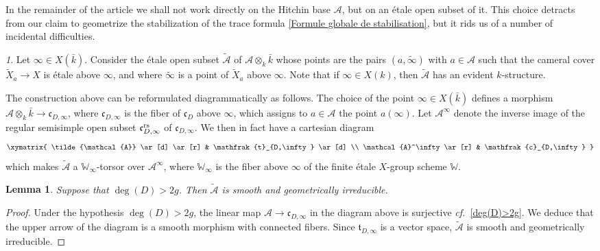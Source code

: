 \documentclass[12pt,english]{smfart}
\numberwithin{equation}{subsection}
\newtheorem{lemma}[equation]{Lemma}
\theoremstyle{remark}
\newtheorem{numero}[equation]{}
\newcommand\cf{{\it cf.\ }}
\newcommand\rs{{\rm rs}}
\begin{document}
In the remainder of the article we shall not work directly on the Hitchin base $\mathcal{A}$, but on an \'etale open subset of it. This choice detracts from our claim to geometrize the stabilization of the trace formula \ref{Formule globale de stabilisation}, but it rids us of a number of incidental difficulties.

\begin{numero}\label{tilde A def}
Let $\infty\in X(\bar k)$. Consider the \'etale open subset $\tilde{\mathcal{A}}$ of $\mathcal{A}\otimes_k\bar k$ whose points are the pairs $(a,\tilde\infty)$ with $a\in\mathcal{A}$ such that the cameral cover $\widetilde X_a\rightarrow X$ is \'etale above $\infty$, and where $\tilde\infty$ is a point of $\widetilde X_a$ above $\infty$. Note that if $\infty\in X(k)$, then $\tilde{\mathcal{A}}$ has an evident $k$-structure.

The construction above can be reformulated diagrammatically as follows. The choice of the point $\infty\in X(\bar k)$ defines a morphism $\mathcal{A}\otimes_k\bar k\rightarrow \mathfrak{c}_{D,\infty}$, where $\mathfrak{c}_{D,\infty}$ is the fiber of $\mathfrak{c}_D$ above $\infty$, which assigns to $a\in\mathcal{A}$ the point $a(\infty)$. Let $\mathcal{A}^\infty$ denote the inverse image of the regular semisimple open subset $\mathfrak{c}^\rs_{D,\infty}$ of $\mathfrak{c}_{D,\infty}$. We then in fact have a cartesian diagram
$$
\xymatrix{
\tilde{\mathcal{A}} \ar[d] \ar[r] & \mathfrak{t}_{D,\infty} \ar[d] \\
\mathcal{A}^\infty \ar[r] & \mathfrak{c}_{D,\infty}
}
$$
which makes $\tilde{\mathcal{A}}$ a $\mathbb{W}_\infty$-torsor over $\mathcal{A}^\infty$, where $\mathbb{W}_\infty$ is the fiber above $\infty$ of the finite \'etale $X$-group scheme $\mathbb{W}$.
\end{numero}

\begin{lemma}\label{connexe tilde A}
Suppose that $\deg(D)>2g$. Then $\tilde{\mathcal{A}}$ is smooth and geometrically irreducible.
\end{lemma}

\begin{proof}
Under the hypothesis $\deg(D)>2g$, the linear map $\mathcal{A}\rightarrow\mathfrak{c}_{D,\infty}$ in the diagram above is surjective \cf \ref{deg(D)>2g}. We deduce that the upper arrow of the diagram is a smooth morphism with connected fibers. Since $\mathfrak{t}_{D,\infty}$ is a vector space, $\tilde{\mathcal{A}}$ is smooth and geometrically irreducible.
\end{proof}
\end{document}
